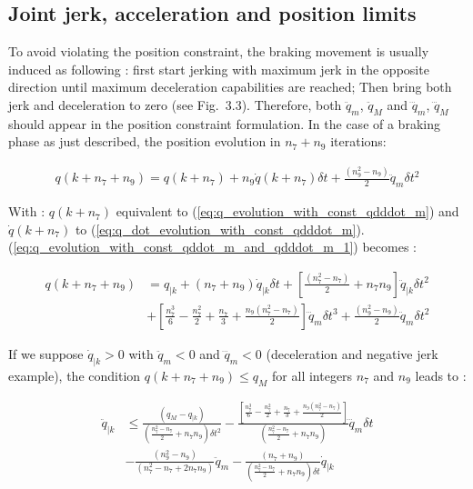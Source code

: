 \documentclass[a4paper, 10pt, conference]{ieeeconf}      %
\begin{document}
{{\subsection{Joint jerk, acceleration and position limits}
To avoid violating the position constraint, the braking movement is usually induced as following : first start jerking with maximum jerk in the opposite direction until maximum deceleration capabilities are reached; Then bring both jerk and deceleration to zero (see Fig.~3.3). Therefore, both $\ddot{q}_m$, $\ddot{q}_M$ and $\dddot{q}_m$, $\dddot{q}_M$  
should appear in the position constraint formulation. In the case of a braking phase as just described, the position evolution in $n_7+n_9$ iterations:

\begin{equation}
\begin{split}
q(k+n_7+n_9)=q(k+n_7) + n_9 \dot{q}(k+n_7) \delta t  + \frac{(n_9^2-n_9)}{2} \ddot{q}_m \delta t^2
\label{eq:q_evolution_with_const_qddot_m_and_qdddot_m_1}
\end{split}
\end{equation} 

With : $q(k+n_7)$ equivalent to (\ref{eq:q_evolution_with_const_qdddot_m}) and $\dot{q}(k+n_7)$ to (\ref{eq:q_dot_evolution_with_const_qdddot_m}).
(\ref{eq:q_evolution_with_const_qddot_m_and_qdddot_m_1}) becomes : 

\begin{equation}
\begin{split}
q(k+n_7+n_9) & =q_{|k} + (n_7+n_9) \dot{q}_{|k} \delta t + [\frac{(n_7^2-n_7)}{2}+n_7 n_9] \ddot{q}_{|k} \delta t^2 \\
             & + [\frac{n_7^3}{6}-\frac{n_7^2}{2}+\frac{n_7}{3}+\frac{n_9(n_7^2-n_7)}  {2}] \dddot{q}_m \delta t^3 + \frac{(n_9^2-n_9)}{2} \ddot{q}_m \delta t^2
\label{eq:q_evolution_with_const_qddot_m_and_qdddot_m_2}
\end{split}
\end{equation} 

If we suppose $\dot{q}_{|k} > 0$ with $\ddot{q}_m < 0$ and $\dddot{q}_m < 0$ (deceleration and negative jerk example), the condition $q(k+n_7+n_9) \leq q_M$ for all integers $n_7$ and $n_9$ leads to :

\begin{equation}
\begin{split}
\ddot{q}_{|k} & \leq \frac{(q_M - q_{|k})}{(\frac{n_7^2 - n_7}{2} + n_7 n_9)\delta t^2}-\frac{[\frac{n_7^3}{6} - \frac{n_7^2}{2} + \frac{n_7}{3} + \frac{n_9(n_7^2-n_7)}{2}]}{(\frac{n_7^2 - n_7}{2} + n_7 n_9)} \dddot{q}_m \delta t \\ & - \frac{(n_9^2-n_9)}{(n_7^2 - n_7 + 2 n_7 n_9)}  \ddot{q}_m- \frac{(n_7+n_9)}{(\frac{n_7^2 - n_7}{2} + n_7 n_9) \delta t} \dot{q}_{|k}
\label{eq:Constr_comp_posi_acc_jerk_1_appendix}
\end{split}
\end{equation}

}}
\end{document}
